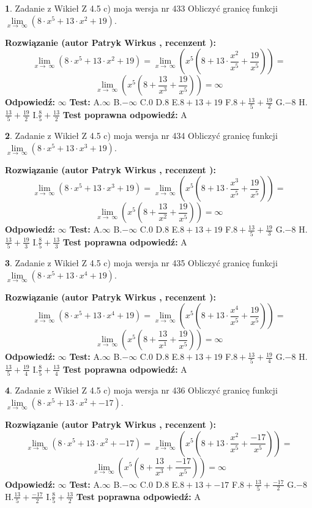 \documentclass[12pt, a4paper]{article}
\theoremstyle{definition} %
\newtheorem{zad}{}
\newcommand{\zadStart}[1]{\begin{zad}#1\newline}
\newcommand{\zadStop}{\end{zad}}
\newcommand{\rozwStart}[2]{\noindent \textbf{Rozwiązanie (autor #1 , recenzent #2): }\newline}
\newcommand{\rozwStop}{\newline}
\newcommand{\odpStart}{\noindent \textbf{Odpowiedź:}\newline}
\newcommand{\odpStop}{\newline}
\newcommand{\testStart}{\noindent \textbf{Test:}\newline}
\newcommand{\testStop}{\newline}
\newcommand{\kluczStart}{\noindent \textbf{Test poprawna odpowiedź:}\newline}
\newcommand{\kluczStop}{\newline}
\begin{document}
\zadStart{Zadanie z Wikieł Z 4.5 c) moja wersja nr 433}
Obliczyć granicę funkcji  $\lim\limits_{x\to\ \infty}(8 \cdot x^{5}+13 \cdot x^{2}+19)$.
\zadStop
\rozwStart{Patryk Wirkus}{}
$$\lim\limits_{x\to\ \infty}(8 \cdot x^{5}+13 \cdot x^{2}+19) = \lim\limits_{x\to\ \infty}(x^{5}(8 +13 \cdot \frac{x^{2}}{x^{5}}+\frac{19}{x^{5}})) =$$ $$\lim\limits_{x\to\ \infty}(x^{5}(8 +\frac{13}{x^{3}}+\frac{19}{x^{5}})) =\infty$$
\rozwStop
\odpStart
$\infty$
\odpStop
\testStart
A.$\infty$ B.$-\infty$ C.$0$ D.$8$ E.$8 + 13 + 19$
F.$8+\frac{13}{5}+\frac{19}{2}$ G.$-8$
H.$\frac{13}{5}+\frac{19}{2}$
I.$\frac{8}{5}+\frac{13}{2}$
\testStop
\kluczStart
A
\kluczStop



\zadStart{Zadanie z Wikieł Z 4.5 c) moja wersja nr 434}
Obliczyć granicę funkcji  $\lim\limits_{x\to\ \infty}(8 \cdot x^{5}+13 \cdot x^{3}+19)$.
\zadStop
\rozwStart{Patryk Wirkus}{}
$$\lim\limits_{x\to\ \infty}(8 \cdot x^{5}+13 \cdot x^{3}+19) = \lim\limits_{x\to\ \infty}(x^{5}(8 +13 \cdot \frac{x^{3}}{x^{5}}+\frac{19}{x^{5}})) =$$ $$\lim\limits_{x\to\ \infty}(x^{5}(8 +\frac{13}{x^{2}}+\frac{19}{x^{5}})) =\infty$$
\rozwStop
\odpStart
$\infty$
\odpStop
\testStart
A.$\infty$ B.$-\infty$ C.$0$ D.$8$ E.$8 + 13 + 19$
F.$8+\frac{13}{5}+\frac{19}{3}$ G.$-8$
H.$\frac{13}{5}+\frac{19}{3}$
I.$\frac{8}{5}+\frac{13}{3}$
\testStop
\kluczStart
A
\kluczStop



\zadStart{Zadanie z Wikieł Z 4.5 c) moja wersja nr 435}
Obliczyć granicę funkcji  $\lim\limits_{x\to\ \infty}(8 \cdot x^{5}+13 \cdot x^{4}+19)$.
\zadStop
\rozwStart{Patryk Wirkus}{}
$$\lim\limits_{x\to\ \infty}(8 \cdot x^{5}+13 \cdot x^{4}+19) = \lim\limits_{x\to\ \infty}(x^{5}(8 +13 \cdot \frac{x^{4}}{x^{5}}+\frac{19}{x^{5}})) =$$ $$\lim\limits_{x\to\ \infty}(x^{5}(8 +\frac{13}{x^{1}}+\frac{19}{x^{5}})) =\infty$$
\rozwStop
\odpStart
$\infty$
\odpStop
\testStart
A.$\infty$ B.$-\infty$ C.$0$ D.$8$ E.$8 + 13 + 19$
F.$8+\frac{13}{5}+\frac{19}{4}$ G.$-8$
H.$\frac{13}{5}+\frac{19}{4}$
I.$\frac{8}{5}+\frac{13}{4}$
\testStop
\kluczStart
A
\kluczStop



\zadStart{Zadanie z Wikieł Z 4.5 c) moja wersja nr 436}
Obliczyć granicę funkcji  $\lim\limits_{x\to\ \infty}(8 \cdot x^{5}+13 \cdot x^{2}+-17)$.
\zadStop
\rozwStart{Patryk Wirkus}{}
$$\lim\limits_{x\to\ \infty}(8 \cdot x^{5}+13 \cdot x^{2}+-17) = \lim\limits_{x\to\ \infty}(x^{5}(8 +13 \cdot \frac{x^{2}}{x^{5}}+\frac{-17}{x^{5}})) =$$ $$\lim\limits_{x\to\ \infty}(x^{5}(8 +\frac{13}{x^{3}}+\frac{-17}{x^{5}})) =\infty$$
\rozwStop
\odpStart
$\infty$
\odpStop
\testStart
A.$\infty$ B.$-\infty$ C.$0$ D.$8$ E.$8 + 13 + -17$
F.$8+\frac{13}{5}+\frac{-17}{2}$ G.$-8$
H.$\frac{13}{5}+\frac{-17}{2}$
I.$\frac{8}{5}+\frac{13}{2}$
\testStop
\kluczStart
A
\kluczStop
\end{document}
